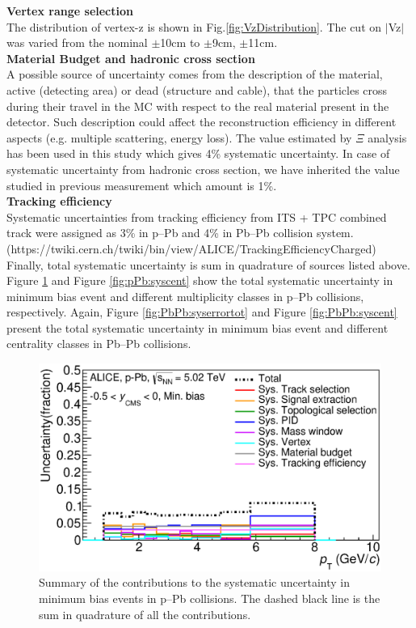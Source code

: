 \textbf{Vertex range selection}\\
The distribution of vertex-z is shown in Fig.\ref{fig:VzDistribution}. The cut on $|$Vz$|$ was varied from the nominal $\pm$10cm to $\pm$9cm, $\pm$11cm.\\

\textbf{Material Budget and hadronic cross section}\\
A possible source of uncertainty comes from the description of the material, active (detecting area) or dead (structure and cable), that the particles cross during their travel in the MC with respect to the real material present in the detector. Such description could affect the reconstruction efficiency in different aspects (e.g. multiple scattering, energy loss). The value estimated by $\Xi$ analysis \cite{cite:strangePbPb} has been used in this study which gives 4\% systematic uncertainty. In case of systematic uncertainty from hadronic cross section, we have inherited the value studied in previous measurement\cite{cite:trackingeffi} which amount is 1\%.\\

\textbf{Tracking efficiency}\\
Systematic uncertainties from tracking efficiency from ITS + TPC combined track were assigned as 3\% in p--Pb and  4\% in Pb--Pb collision system.\cite{cite:trackingeffi} \\
(https://twiki.cern.ch/twiki/bin/view/ALICE/TrackingEfficiencyCharged)\\


Finally, total systematic uncertainty is sum in quadrature of sources listed above. Figure \ref{fig:pPb:syserrortot} and Figure \ref{fig:pPb:syscent} show the total systematic uncertainty in minimum bias event and different multiplicity classes in p--Pb collisions, respectively. Again, Figure \ref{fig:PbPb:syserrortot} and Figure \ref{fig:PbPb:syscent} present the total systematic uncertainty in minimum bias event and different centrality classes in Pb--Pb collisions.


\begin{figure}[htbp]
\begin{center}
\includegraphics[width=12.0cm]{./Version1/FigChapter5/Systematic/pPbSysTotalFinal.eps}
\caption{Summary of the contributions to the systematic uncertainty in minimum bias events in p--Pb collisions. The dashed black line is the sum in quadrature of all the contributions.} 
\label{fig:pPb:syserrortot}
\end{center}
\end{figure}

